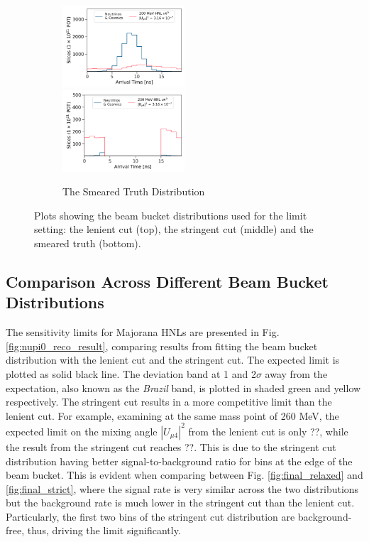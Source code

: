 \begin{figure}[htbp!]
\begin{subfigure}[b]{1.0\textwidth}
       	    \vspace{0.5cm}
        \end{subfigure}
        \begin{subfigure}[b]{1.0\textwidth}
            \includegraphics[width=0.5\textwidth]{smeared_truth}
            \includegraphics[width=0.5\textwidth]{smeared_truth_edge}
            \caption{The Smeared Truth Distribution}%
	    \label{fig:final_truth}
     	    \vspace{0.5cm}
        \end{subfigure}
        \caption{
	Plots showing the beam bucket distributions used for the limit setting: the lenient cut (top), the stringent cut (middle) and the smeared truth (bottom).
	}
\end{figure}

\subsection{Comparison Across Different Beam Bucket Distributions}

The sensitivity limits for Majorana HNLs are presented in Fig. \ref{fig:nupi0_reco_result}, comparing results from fitting the beam bucket distribution with the lenient cut and the stringent cut.
The expected limit is plotted as solid black line.
The deviation band at 1 and 2$\sigma$ away from the expectation, also known as the \textit{Brazil} band, is plotted in shaded green and yellow respectively.
The stringent cut results in a more competitive limit than the lenient cut. 
For example, examining at the same mass point of 260 MeV, the expected limit on the mixing angle $|U_{\mu4}|^2$ from the lenient cut is only ??, while the result from the stringent cut reaches ??.
This is due to the stringent cut distribution having better signal-to-background ratio for bins at the edge of the beam bucket.
This is evident when comparing between Fig. \ref{fig:final_relaxed} and \ref{fig:final_strict}, where the signal rate is very similar across the two distributions but the background rate is much lower in the stringent cut than the lenient cut.
Particularly, the first two bins of the stringent cut distribution are background-free, thus, driving the limit significantly.

